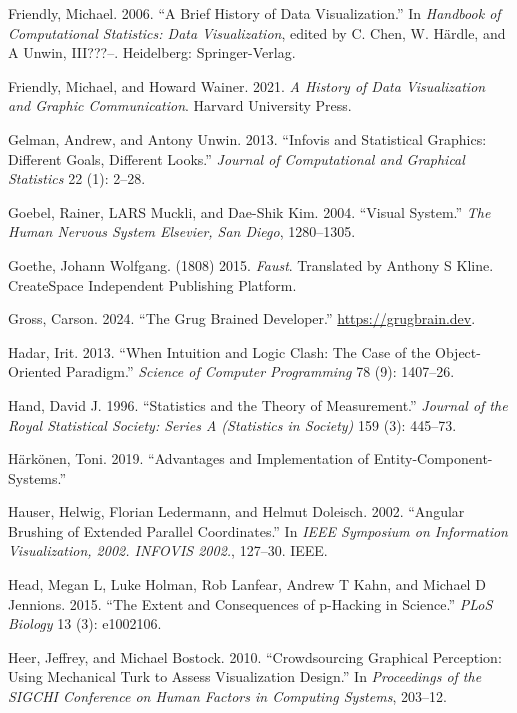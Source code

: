 \documentclass[
]{book}
\newlength{\cslhangindent}
\newenvironment{CSLReferences}[2] %
 {\begin{list}{}{%
  \setlength{\itemindent}{0pt}
  \setlength{\leftmargin}{0pt}
  \setlength{\parsep}{0pt}
  \ifodd #1
   \setlength{\leftmargin}{\cslhangindent}
   \setlength{\itemindent}{-1\cslhangindent}
  \fi
  \setlength{\itemsep}{#2\baselineskip}}}
 {\end{list}}
\theoremstyle{definition}
\theoremstyle{definition}
\theoremstyle{definition}
\theoremstyle{definition}
\theoremstyle{remark}
\begin{document}
\begin{CSLReferences}{1}{0}
Friendly, Michael. 2006. {``A Brief History of Data Visualization.''} In \emph{Handbook of Computational Statistics: Data Visualization}, edited by C. Chen, W. Härdle, and A Unwin, III???--. Heidelberg: Springer-Verlag.

Friendly, Michael, and Howard Wainer. 2021. \emph{A History of Data Visualization and Graphic Communication}. Harvard University Press.

Gelman, Andrew, and Antony Unwin. 2013. {``Infovis and Statistical Graphics: Different Goals, Different Looks.''} \emph{Journal of Computational and Graphical Statistics} 22 (1): 2--28.

Goebel, Rainer, LARS Muckli, and Dae-Shik Kim. 2004. {``Visual System.''} \emph{The Human Nervous System Elsevier, San Diego}, 1280--1305.

Goethe, Johann Wolfgang. (1808) 2015. \emph{Faust}. Translated by Anthony S Kline. CreateSpace Independent Publishing Platform.

Gross, Carson. 2024. {``The Grug Brained Developer.''} \url{https://grugbrain.dev}.

Hadar, Irit. 2013. {``When Intuition and Logic Clash: The Case of the Object-Oriented Paradigm.''} \emph{Science of Computer Programming} 78 (9): 1407--26.

Hand, David J. 1996. {``Statistics and the Theory of Measurement.''} \emph{Journal of the Royal Statistical Society: Series A (Statistics in Society)} 159 (3): 445--73.

Härkönen, Toni. 2019. {``Advantages and Implementation of Entity-Component-Systems.''}

Hauser, Helwig, Florian Ledermann, and Helmut Doleisch. 2002. {``Angular Brushing of Extended Parallel Coordinates.''} In \emph{IEEE Symposium on Information Visualization, 2002. INFOVIS 2002.}, 127--30. IEEE.

Head, Megan L, Luke Holman, Rob Lanfear, Andrew T Kahn, and Michael D Jennions. 2015. {``The Extent and Consequences of p-Hacking in Science.''} \emph{PLoS Biology} 13 (3): e1002106.

Heer, Jeffrey, and Michael Bostock. 2010. {``Crowdsourcing Graphical Perception: Using Mechanical Turk to Assess Visualization Design.''} In \emph{Proceedings of the SIGCHI Conference on Human Factors in Computing Systems}, 203--12.


\end{CSLReferences}
\end{document}
